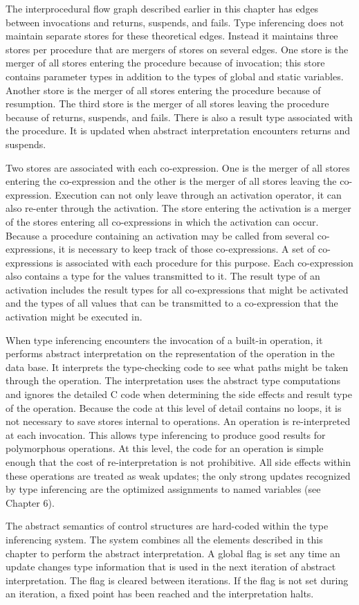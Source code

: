 The interprocedural flow graph described earlier in this chapter has
edges between invocations and returns, suspends, and fails. Type
inferencing does not maintain separate stores for these theoretical
edges. Instead it maintains three stores per procedure that are
mergers of stores on several edges. One store is the merger of all
stores entering the procedure because of invocation; this store
contains parameter types in addition to the types of global and static
variables. Another store is the merger of all stores entering the
procedure because of resumption. The third store is the merger of all
stores leaving the procedure because of returns, suspends, and
fails. There is also a result type associated with the procedure. It
is updated when abstract interpretation encounters returns and
suspends.

Two stores are associated with each co-expression. One is the merger
of all stores entering the co-expression and the other is the merger
of all stores leaving the co-expression. Execution can not only leave
through an activation operator, it can also re-enter through the
activation. The store entering the activation is a merger of the
stores entering all co-expressions in which the activation can
occur. Because a procedure containing an activation may be called from
several co-expressions, it is necessary to keep track of those
co-expressions. A set of co-expressions is associated with each
procedure for this purpose. Each co-expression also contains a type
for the values transmitted to it. The result type of an activation
includes the result types for all co-expressions that might be
activated and the types of all values that can be transmitted to a
co-expression that the activation might be executed in.

When type inferencing encounters the invocation of a built-in
operation, it performs abstract interpretation on the representation
of the operation in the data base. It interprets the type-checking
code to see what paths might be taken through the operation. The
interpretation uses the abstract type computations and ignores the
detailed C code when determining the side effects and result type of
the operation. Because the code at this level of detail contains no
loops, it is not necessary to save stores internal to operations. An
operation is re-interpreted at each invocation.  This allows type
inferencing to produce good results for polymorphous operations. At
this level, the code for an operation is simple enough that the cost
of re-interpretation is not prohibitive. All side effects within these
operations are treated as weak updates; the only strong updates
recognized by type inferencing are the optimized assignments to named
variables (see Chapter 6).

The abstract semantics of control structures are hard-coded within the
type inferencing system. The system combines all the elements
described in this chapter to perform the abstract interpretation. A
global flag is set any time an update changes type information that is
used in the next iteration of abstract interpretation. The flag is
cleared between iterations. If the flag is not set during an
iteration, a fixed point has been reached and the interpretation
halts.

\bigskip
